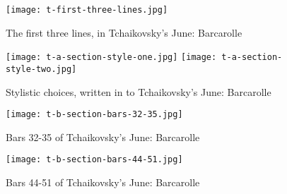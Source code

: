 \begin{figure}
  \centering
  \texttt{[image: t-first-three-lines.jpg]}
  \caption{The first three lines, in Tchaikovsky's June: Barcarolle}
  \label{fig:t-first-three-lines}
\end{figure}

\begin{figure}
  \centering
  \texttt{[image: t-a-section-style-one.jpg]}
  \texttt{[image: t-a-section-style-two.jpg]}
  \caption[Ornamentation Examples, in Tchaikovsky's June: Barcarolle]{Stylistic choices, written in to Tchaikovsky's June: Barcarolle}
  \label{fig:t-a-section-style-choices}
\end{figure}

\begin{figure}
  \centering
  \texttt{[image: t-b-section-bars-32-35.jpg]}
  \caption{Bars 32-35 of Tchaikovsky's June: Barcarolle}
  \label{fig:t-b-section-bars-32-35}
\end{figure}

\begin{figure}
  \centering
  \texttt{[image: t-b-section-bars-44-51.jpg]}
  \caption{Bars 44-51 of Tchaikovsky's June: Barcarolle}
  \label{fig:t-b-section-bars-44-51}
\end{figure}


